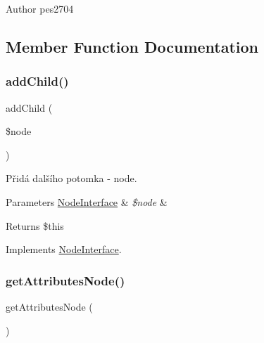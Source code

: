 \begin{DoxyAuthor}{Author}
pes2704 
\end{DoxyAuthor}


\subsection{Member Function Documentation}
\mbox{\label{class_pes_1_1_dom_1_1_node_1_1_tag_1_1_html_a1d59c3782ba90a94f31ee6c58d86e9fc}} 
\subsubsection{\texorpdfstring{add\+Child()}{addChild()}}
{\footnotesize\ttfamily add\+Child (\begin{DoxyParamCaption}\item[{\mbox{\hyperlink{interface_pes_1_1_dom_1_1_node_1_1_node_interface}{Node\+Interface}}}]{\$node }\end{DoxyParamCaption})}

Přidá dalšího potomka -\/ node.


\begin{DoxyParams}[1]{Parameters}
\mbox{\hyperlink{interface_pes_1_1_dom_1_1_node_1_1_node_interface}{Node\+Interface}} & {\em \$node} & \\
\hline
\end{DoxyParams}
\begin{DoxyReturn}{Returns}
\$this 
\end{DoxyReturn}


Implements \mbox{\hyperlink{interface_pes_1_1_dom_1_1_node_1_1_node_interface_a1d59c3782ba90a94f31ee6c58d86e9fc}{Node\+Interface}}.

\mbox{\label{class_pes_1_1_dom_1_1_node_1_1_tag_1_1_html_a4722e7722b245351681b05d35f6694f3}} 
\subsubsection{\texorpdfstring{get\+Attributes\+Node()}{getAttributesNode()}}
{\footnotesize\ttfamily get\+Attributes\+Node (\begin{DoxyParamCaption}{ }\end{DoxyParamCaption})}

